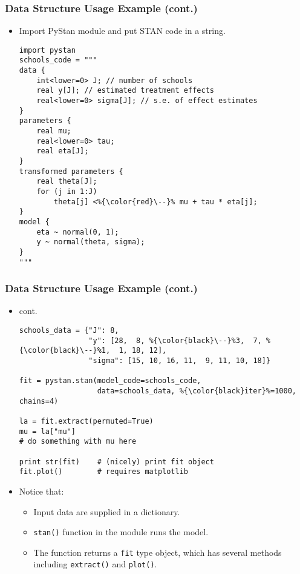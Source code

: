 \documentclass{beamer}
\begin{document}
\begin{frame}[fragile]
\frametitle{Data Structure Usage Example (cont.)}
\begin{itemize}
\item Import PyStan module and put STAN code
      in a string.
\begin{lstlisting}[escapechar=\%]
import pystan
schools_code = """
data {
    int<lower=0> J; // number of schools
    real y[J]; // estimated treatment effects
    real<lower=0> sigma[J]; // s.e. of effect estimates
}
parameters {
    real mu;
    real<lower=0> tau;
    real eta[J];
}
transformed parameters {
    real theta[J];
    for (j in 1:J)
        theta[j] <%{\color{red}\--}% mu + tau * eta[j];
}
model {
    eta ~ normal(0, 1);
    y ~ normal(theta, sigma);
}
"""
\end{lstlisting}
\end{itemize}
\end{frame}

\begin{frame}[fragile]
\frametitle{Data Structure Usage Example (cont.)}
\begin{itemize}
\item cont.
\begin{lstlisting}[escapechar=\%]
schools_data = {"J": 8,
                "y": [28,  8, %{\color{black}\--}%3,  7, %{\color{black}\--}%1,  1, 18, 12],
                "sigma": [15, 10, 16, 11,  9, 11, 10, 18]}

fit = pystan.stan(model_code=schools_code, 
                  data=schools_data, %{\color{black}iter}%=1000, chains=4)

la = fit.extract(permuted=True)
mu = la["mu"] 
# do something with mu here

print str(fit)    # (nicely) print fit object
fit.plot()        # requires matplotlib
\end{lstlisting}
\item Notice that:
\begin{itemize}
\item Input data are supplied in a dictionary. 
\item \lstinline{stan()} function in the module runs
      the model.
\item The function returns a \lstinline{fit} type object, which
      has several methods including \lstinline{extract()}
      and \lstinline{plot()}.
\end{itemize}
\end{itemize}
\end{frame}
\end{document}
